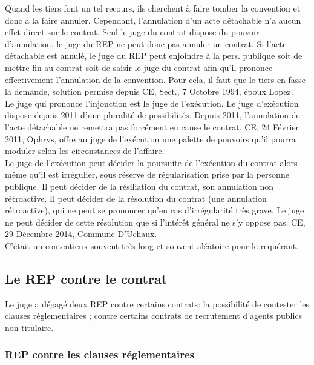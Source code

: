 \documentclass[10pt, a4paper, openany]{book}
\begin{document}
Quand les tiers font un tel recours, ils cherchent à faire tomber la convention et donc à la faire annuler. Cependant, l'annulation d'un acte détachable n'a aucun effet direct sur le contrat. Seul le juge du contrat dispose du pouvoir d'annulation, le juge du REP ne peut donc pas annuler un contrat. Si l'acte détachable est annulé, le juge du REP peut enjoindre à la pers. publique soit de mettre fin au contrat soit de saisir le juge du contrat afin qu'il prononce effectivement l'annulation de la convention. Pour cela, il faut que le tiers en fasse la demande, solution permise depuis CE, Sect., 7 Octobre 1994, époux Lopez. \\
Le juge qui prononce l'injonction est le juge de l'exécution. Le juge d'exécution dispose depuis 2011 d'une pluralité de possibilités. Depuis 2011, l'annulation de l'acte détachable ne remettra pas forcément en cause le contrat. CE, 24 Février 2011, Ophrys, offre au juge de l'exécution une palette de pouvoirs qu'il pourra moduler selon les circonstances de l'affaire. \\
Le juge de l'exécution peut décider la poursuite de l'exécution du contrat alors même qu'il est irrégulier, sous réserve de régularisation prise par la personne publique. Il peut décider de la résiliation du contrat, son annulation non rétroactive. Il peut décider de la résolution du contrat (une annulation rétroactive), qui ne peut se prononcer qu'en cas d'irrégularité très grave. Le juge ne peut décider de cette résolution que si l'intérêt général ne s'y oppose pas. CE, 29 Décembre 2014, Commune D'Uchaux. \\
C'était un contentieux souvent très long et souvent aléatoire pour le requérant. 

\subsection{Le REP contre le contrat}

Le juge a dégagé deux REP contre certains contrats: la possibilité de contester les clauses réglementaires ; contre certains contrats de recrutement d'agents publics non titulaire. 

\subsubsection{REP contre les clauses réglementaires}
\end{document}
